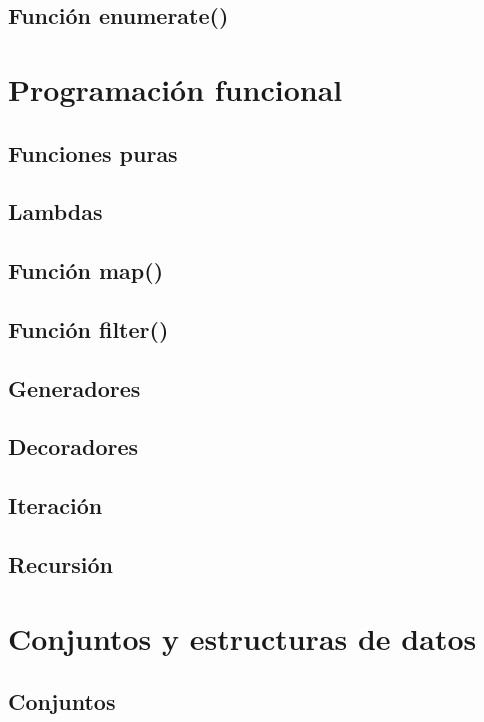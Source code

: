 \documentclass{report}
\begin{document}
\section{Función enumerate()}

\clearpage\chapter{Programación funcional}

\section{Funciones puras}

\section{Lambdas}

\section{Función map()}

\section{Función filter()}

\section{Generadores}

\section{Decoradores}

\section{Iteración}

\section{Recursión}

\clearpage\chapter{Conjuntos y estructuras de datos}

\section{Conjuntos}
\end{document}
